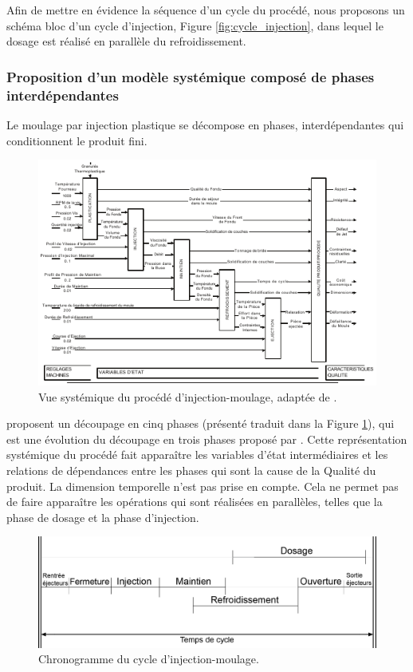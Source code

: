 Afin de mettre en évidence la séquence d’un cycle du procédé, nous proposons un schéma bloc d’un cycle d’injection, Figure \ref{fig:cycle_injection}, dans lequel le dosage est réalisé en parallèle du refroidissement.

\subsubsection{Proposition d'un modèle systémique composé de phases interdépendantes}
Le moulage par injection plastique se décompose en phases, interdépendantes qui conditionnent le produit fini.
\begin{figure}[hbtp]
	\centering
	\includegraphics[width=\textwidth,height=\textheight,keepaspectratio]{../Chap1/Figures/Kazmer_1999-Process.pdf}
	\caption{Vue systémique du procédé d'injection-moulage, adaptée de \cite{kazmer_towards_1999}.}
	\label{fig:kazmer_systematic}
\end{figure}
\cite{kazmer_towards_1999} proposent un découpage en cinq phases (présenté traduit dans la Figure \ref{fig:kazmer_systematic}), qui est une  évolution du découpage en trois phases proposé par \cite{ma_design_1974}.
Cette représentation systémique du procédé fait apparaître les variables d’état intermédiaires et les relations de dépendances entre les phases qui sont la cause de la Qualité du produit.
La dimension temporelle n’est pas prise en compte.
Cela ne permet pas de faire apparaître les opérations qui sont réalisées en parallèles, telles que la phase de dosage et la phase d'injection.

\begin{figure}[hbtp]
	\centering
	\includegraphics[width=\textwidth,height=\textheight,keepaspectratio]{../Chap1/Figures/SAPRISTI_Chronogramme-Simple.png}
	\caption{Chronogramme du cycle d'injection-moulage.}
	\label{fig:chronogramme}
\end{figure}

